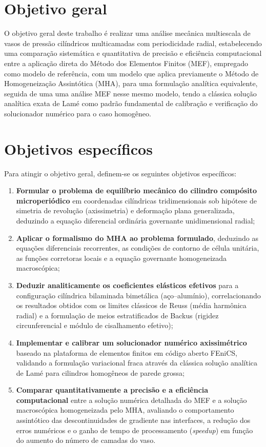 \section{Objetivo geral}

O objetivo geral deste trabalho é realizar uma análise mecânica multiescala de vasos de pressão cilíndricos multicamadas com periodicidade radial, estabelecendo uma comparação sistemática e quantitativa de precisão e eficiência computacional entre a aplicação direta do Método dos Elementos Finitos (MEF), empregado como modelo de referência, com um modelo que aplica previamente o Método de Homogeneização Assintótica (MHA), para uma formulação analítica equivalente, seguida de uma uma análise MEF nesse mesmo modelo, tendo a clássica solução analítica exata de Lamé como padrão fundamental de calibração e verificação do solucionador numérico para o caso homogêneo.

\section{Objetivos específicos}

Para atingir o objetivo geral, definem-se os seguintes objetivos específicos:

\begin{enumerate}
  \item \textbf{Formular o problema de equilíbrio mecânico do cilindro compósito microperiódico} em coordenadas cilíndricas tridimensionais sob hipótese de simetria de revolução (axissimetria) e deformação plana generalizada, deduzindo a equação diferencial ordinária governante unidimensional radial;
  \item \textbf{Aplicar o formalismo do MHA ao problema formulado}, deduzindo as equações diferenciais recorrentes, as condições de contorno de célula unitária, as funções corretoras locais e a equação governante homogeneizada macroscópica;
  \item \textbf{Deduzir analiticamente os coeficientes elásticos efetivos} para a configuração cilíndrica bilaminada bimetálica (aço--alumínio), correlacionando os resultados obtidos com os limites clássicos de Reuss (média harmônica radial) e a formulação de meios estratificados de Backus (rigidez circunferencial e módulo de cisalhamento efetivo);
  \item \textbf{Implementar e calibrar um solucionador numérico axissimétrico} baseado na plataforma de elementos finitos em código aberto FEniCS, validando a formulação variacional fraca através da clássica solução analítica de Lamé para cilindros homogêneos de parede grossa;
  \item \textbf{Comparar quantitativamente a precisão e a eficiência computacional} entre a solução numérica detalhada do MEF e a solução macroscópica homogeneizada pelo MHA, avaliando o comportamento assintótico das descontinuidades de gradiente nas interfaces, a redução dos erros numéricos e o ganho de tempo de processamento (\textit{speedup}) em função do aumento do número de camadas do vaso.
\end{enumerate}

